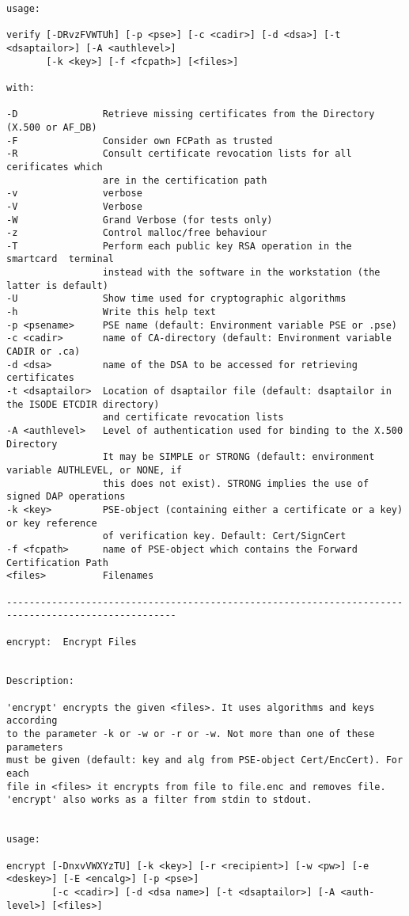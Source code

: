 {\begin{verbatim}
usage:

verify [-DRvzFVWTUh] [-p <pse>] [-c <cadir>] [-d <dsa>] [-t <dsaptailor>] [-A <authlevel>]
       [-k <key>] [-f <fcpath>] [<files>]

with:

-D               Retrieve missing certificates from the Directory (X.500 or AF_DB)
-F               Consider own FCPath as trusted
-R               Consult certificate revocation lists for all cerificates which
                 are in the certification path
-v               verbose
-V               Verbose
-W               Grand Verbose (for tests only)
-z               Control malloc/free behaviour
-T               Perform each public key RSA operation in the smartcard  terminal
                 instead with the software in the workstation (the latter is default)
-U               Show time used for cryptographic algorithms
-h               Write this help text
-p <psename>     PSE name (default: Environment variable PSE or .pse)
-c <cadir>       name of CA-directory (default: Environment variable CADIR or .ca)
-d <dsa>         name of the DSA to be accessed for retrieving certificates
-t <dsaptailor>  Location of dsaptailor file (default: dsaptailor in the ISODE ETCDIR directory)
                 and certificate revocation lists
-A <authlevel>   Level of authentication used for binding to the X.500 Directory
                 It may be SIMPLE or STRONG (default: environment variable AUTHLEVEL, or NONE, if
                 this does not exist). STRONG implies the use of signed DAP operations
-k <key>         PSE-object (containing either a certificate or a key) or key reference 
                 of verification key. Default: Cert/SignCert
-f <fcpath>      name of PSE-object which contains the Forward Certification Path
<files>          Filenames

----------------------------------------------------------------------------------------------------

encrypt:  Encrypt Files


Description:

'encrypt' encrypts the given <files>. It uses algorithms and keys according
to the parameter -k or -w or -r or -w. Not more than one of these parameters
must be given (default: key and alg from PSE-object Cert/EncCert). For each
file in <files> it encrypts from file to file.enc and removes file.
'encrypt' also works as a filter from stdin to stdout.


usage:

encrypt [-DnxvVWXYzTU] [-k <key>] [-r <recipient>] [-w <pw>] [-e <deskey>] [-E <encalg>] [-p <pse>] 
        [-c <cadir>] [-d <dsa name>] [-t <dsaptailor>] [-A <auth-level>] [<files>]


\end{verbatim}}
